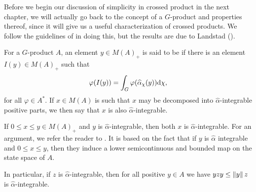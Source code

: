 Before we begin our discussion of simplicity in crossed product in the next chapter, we will actually go back to the concept of a $G$-product and properties thereof, since it will give us a useful characterization of crossed products. We follow the guidelines of \cite{olesenpedersen1} in doing this, but the results are due to Landstad (\cite{landstad1979duality}).
\begin{definition}
	For a $G$-product $A$, an element $y \in M(A)_+$ is said to be  if there is an element $I(y) \in M(A)_+$ such that
	\begin{align*}
		\varphi(I(y)) = \int_G \varphi(\widehat{\alpha}_\chi (y)) \mathrm{d} \chi,
	\end{align*}
	for all $\varphi \in A^*$. If $x \in M(A)$ is such that $x$ may be decomposed into $\hat \alpha$-integrable positive parts, we then say that $x$ is also $\hat \alpha$-integrable.
\end{definition}
\begin{note}
	If $0 \leq x \leq y \in M(A)_+$ and $y$ is $\hat \alpha$-integrable, then both $x$ is $\hat \alpha$-integrable. For an argument, we refer the reader to \cite[Remark 7.8.4]{pedersenalgauto}. It is based on the fact that if $y$ is $\hat \alpha$ integrable and $0 \leq x \leq y$, then they induce a lower semicontinuous and bounded map on the state space of $A$.

	In particular, if $z$ is $\hat \alpha $-integrable, then for all positive $y \in A$ we have $yzy \leq \left\lVert y \right\rVert z$ is $\hat \alpha$-integrable.
\label{noteinthered}
\end{note}


